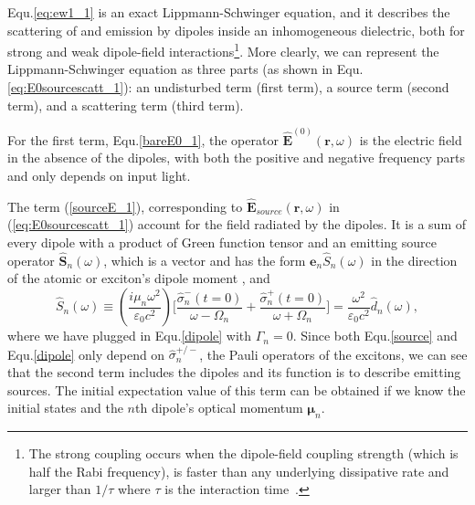 Equ.\eqref{eq:ew1_1} is an exact Lippmann-Schwinger equation, and it describes the scattering of and emission by dipoles inside an inhomogeneous dielectric, both for strong and weak dipole-field interactions\footnote{The strong coupling occurs when the dipole-field coupling strength (which is half the Rabi frequency), is faster than any underlying dissipative rate and larger than $1/\tau$ where $\tau$ is the interaction time~\cite{Kimble1998}.}.
More clearly, we can represent the Lippmann-Schwinger equation as three parts (as shown in Equ.\eqref{eq:E0sourcescatt_1}): an undisturbed term
(first term), a source term (second term), and a scattering term (third term).


For the first term, Equ.\eqref{bareE0_1}, the operator $\mathbf{\hat{E}}^{(0)}(\mathbf{r},\omega)$ is the electric field in the absence of the dipoles, with both the positive and negative frequency parts and only depends on input light.


The term (\ref{sourceE_1}), corresponding to $\mathbf{\hat{E}}_{source}(\mathbf{r},\omega)$ in (\ref{eq:E0sourcescatt_1}) account for the field radiated by the dipoles. It is a sum of every dipole with a product of Green function tensor and an emitting source operator $\hat{\mathbf{S}}_n(\omega)$,
which is a vector and has the form $\mathbf{e}_n\hat{S}_n(\omega)$ in the direction of the atomic or exciton's dipole moment \cite{Wubs2004}, and
\begin{equation}
 \label{source}
 \hat{S}_n(\omega) \equiv \left(\frac{i\mu_n\omega^2}{\varepsilon_0c^2}\right)
\lbrack\frac{\hat{\sigma}_n^-(t=0)}{\omega-\Omega_n}+\frac{\hat{\sigma}_n^+(t=0)}{\omega+\Omega_n}\rbrack
=\frac{\omega^2}{\varepsilon_0c^2}\hat{d}_n(\omega),
\end{equation}
where we have plugged in Equ.\eqref{dipole} with $\Gamma_n=0$.
Since both Equ.\eqref{source} and Equ.\eqref{dipole} only depend on $\hat{\sigma}^{+/-}_n$, the Pauli operators of the excitons,
we can see that the second term includes the dipoles and its function is to describe emitting sources.
The initial expectation value of this term can be obtained if we know the initial states and the $n$th dipole's optical momentum \(\boldsymbol{\mu}_n\).

